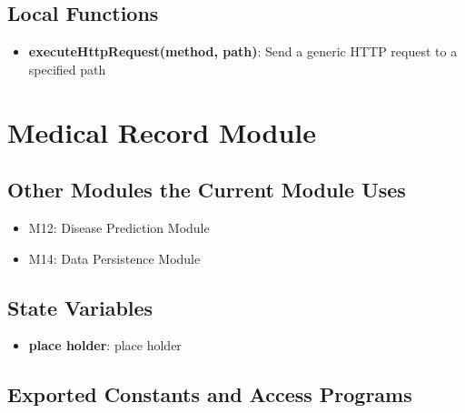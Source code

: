 \documentclass[12pt, titlepage]{article}
\begin{document}
\subsection{Local Functions}
\begin{itemize}
  \item \textbf{executeHttpRequest(method, path)}: Send a generic HTTP request to a specified path
\end{itemize}

\section{Medical Record Module}

\subsection{Other Modules the Current Module Uses}
\begin{itemize}
  \item M12: Disease Prediction Module
  \item M14: Data Persistence Module
\end{itemize}

\subsection{State Variables}
\begin{itemize}
\item \textbf{place holder}: place holder
\end{itemize}

\subsection{Exported Constants and Access Programs}
\end{document}
